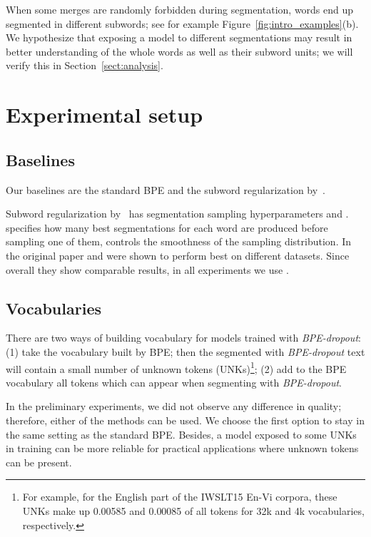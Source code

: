 \documentclass[11pt,a4paper]{article}
\begin{document}
When some merges are randomly forbidden during segmentation, words end up segmented in different subwords; see for example Figure~\ref{fig:intro_examples}(b). We hypothesize that exposing a model to different segmentations may result in better understanding of the whole words as well as their subword units; we will verify this in Section~\ref{sect:analysis}. 


\section{Experimental setup}
\label{sec:exp_setup}


\subsection{Baselines}

Our baselines are the standard BPE and the subword regularization by~\citet{sentencepiece}.


Subword regularization by~\citet{sentencepiece} has segmentation sampling hyperparameters  and .  specifies how many best segmentations for each word are produced before sampling one of them,  controls the smoothness of the sampling distribution. In the original paper  and   were shown to perform best on different datasets. Since overall they show comparable results, in all experiments we use . 


\subsection{Vocabularies}

There are two ways of building vocabulary for models trained with \textit{BPE-dropout}:
(1) take the vocabulary built by BPE; then the segmented with \textit{BPE-dropout} text will contain a small number of unknown tokens (\textsc{UNK}s)\footnote{For example, for the English part of the IWSLT15 En-Vi corpora, these \textsc{UNK}s make up 0{.}00585 and 0{.}00085 of all tokens for 32k and 4k vocabularies, respectively.};
    (2) add to the BPE vocabulary all tokens which can appear when segmenting with \textit{BPE-dropout}. 

In the preliminary experiments, we did not observe any difference in quality; therefore, either of the methods can be used. We choose the first option to stay in the same setting as the standard BPE. Besides, a model exposed to some \textsc{UNK}s in training can be more reliable for practical applications where unknown tokens can be present.
\end{document}
